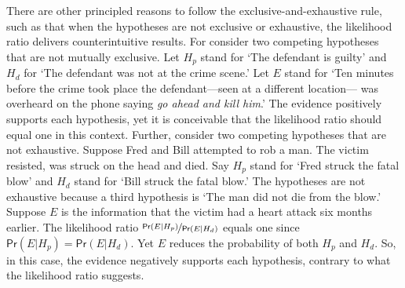 \documentclass{article}
\newcommand{\pr}{\mathsf{Pr}}
\begin{document}
There are other principled reasons to follow the exclusive-and-exhaustive rule, such as that when the hypotheses are not exclusive or exhaustive, 
the likelihood ratio delivers counterintuitive results.
%
%
For consider two competing hypotheses %
that are not mutually exclusive.
Let $H_p$ stand for `The defendant is guilty' and $H_d$ for `The defendant was not at the crime scene.' 
Let $E$ stand for `Ten minutes before the crime took place the defendant---seen at a different location--- was overheard on the phone saying \emph{go ahead and kill him}.' 
The evidence positively supports each hypothesis, yet it is conceivable that the likelihood ratio should equal one in this context. %
%
Further, consider two competing hypotheses that are not exhaustive.
Suppose Fred and Bill attempted to rob a man. The victim resisted, was struck on the head and died. Say $H_p$ stand for `Fred struck the fatal blow' and $H_d$ stand for `Bill struck the fatal blow.' The hypotheses are not exhaustive because a third hypothesis is  `The man did not die from the blow.' Suppose $E$ is the information that the victim had a heart attack six months earlier. The likelihood ratio $\nicefrac{\pr(E \vert H_p)}{\pr(E \vert H_d)}$  equals one since  $\pr(E\vert H_p)=\pr(E\vert H_d)$. Yet $E$ reduces the probability of both $H_p$ and $H_d$. So, in this case, the evidence negatively supports each hypothesis, contrary to what the likelihood ratio suggests.  
\end{document}
